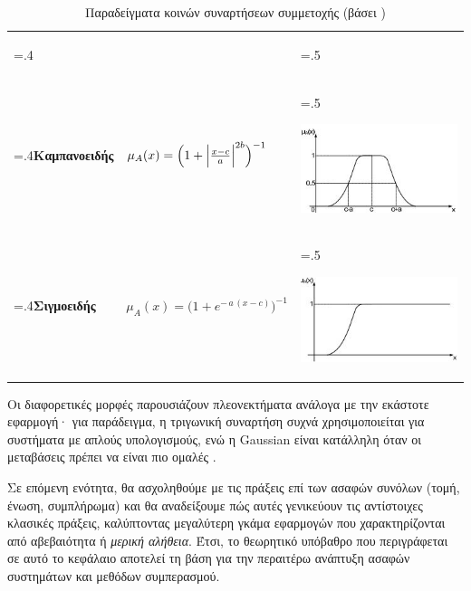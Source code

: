 \begin{table}[h!]
\begin{tabularx}{\textwidth}{>{\hsize=.4\hsize}X X >{\hsize=.5\hsize}X}
\begin{center}
           \end{center}\\
         \textbf{Καμπανοειδής}
         & \(\displaystyle \mu_{A}(x) = \Bigl(1 + \Bigl|\tfrac{x-c}{a}\Bigr|^{2b}\Bigr)^{-1}\)
         & \begin{center}
             \includegraphics[scale=0.7]{images/bell.jpg}
           \end{center}\\
         \textbf{Σιγμοειδής}
         & \(\displaystyle \mu_{A}(x) = \bigl(1 + e^{-\,a\,(x-c)}\bigr)^{-1}\)
         & \begin{center}
             \includegraphics[scale=0.7]{images/sigm.jpg}
           \end{center}\\
    \end{tabularx}
    \caption{Παραδείγματα κοινών συναρτήσεων συμμετοχής (βάσει \cite{KlirYuan1995,Ross2010})}
    \label{tab:part}
\end{table}

\medskip
Οι διαφορετικές μορφές παρουσιάζουν πλεονεκτήματα ανάλογα με την εκάστοτε εφαρμογή· για παράδειγμα, η τριγωνική συναρτήση συχνά χρησιμοποιείται για συστήματα με απλούς υπολογισμούς, ενώ η \textlatin{Gaussian} είναι κατάλληλη όταν οι μεταβάσεις πρέπει να είναι πιο ομαλές \cite{Zadeh1965,Ross2010}.

\medskip
Σε επόμενη ενότητα, θα ασχοληθούμε με τις πράξεις επί των ασαφών συνόλων (τομή, ένωση, συμπλήρωμα) και θα αναδείξουμε πώς αυτές γενικεύουν τις αντίστοιχες κλασικές πράξεις, καλύπτοντας μεγαλύτερη γκάμα εφαρμογών που χαρακτηρίζονται από αβεβαιότητα ή \emph{μερική αλήθεια}. Έτσι, το θεωρητικό υπόβαθρο που περιγράφεται σε αυτό το κεφάλαιο αποτελεί τη βάση για την περαιτέρω ανάπτυξη ασαφών συστημάτων και μεθόδων συμπερασμού.

